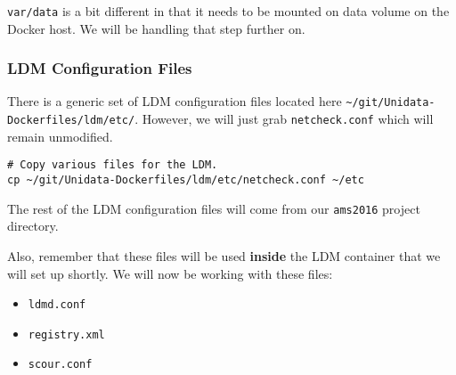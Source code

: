 \documentclass[11pt]{article}
\begin{document}
\texttt{var/data} is a bit different in that it needs to be mounted on data volume on the Docker host. We will be handling that step further on.

\subsubsection{LDM Configuration Files}
\label{sec:orgheadline22}

There is a generic set of LDM configuration files located here \texttt{\textasciitilde{}/git/Unidata-Dockerfiles/ldm/etc/}. However, we will just grab \texttt{netcheck.conf} which will remain unmodified.

\begin{verbatim}
# Copy various files for the LDM.
cp ~/git/Unidata-Dockerfiles/ldm/etc/netcheck.conf ~/etc
\end{verbatim}

The rest of the LDM configuration files will come from our \texttt{ams2016} project directory.

Also, remember that these files will be used \textbf{inside} the LDM container that we will set up shortly. We will now be working with these files:

\begin{itemize}
\item \texttt{ldmd.conf}
\item \texttt{registry.xml}
\item \texttt{scour.conf}
\end{itemize}
\end{document}
